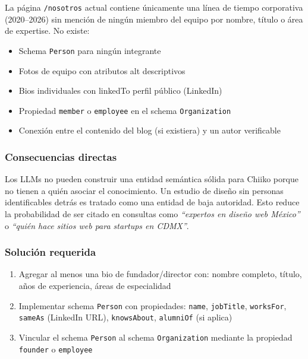 \documentclass[12pt, a4paper]{article}
\begin{document}
La página \texttt{/nosotros} actual contiene únicamente una línea de tiempo corporativa (2020–2026) sin mención de ningún miembro del equipo por nombre, título o área de expertise. No existe:
\begin{itemize}[itemsep=3pt]
  \item Schema \texttt{Person} para ningún integrante
  \item Fotos de equipo con atributos alt descriptivos
  \item Bios individuales con linkedTo perfil público (LinkedIn)
  \item Propiedad \texttt{member} o \texttt{employee} en el schema \texttt{Organization}
  \item Conexión entre el contenido del blog (si existiera) y un autor verificable
\end{itemize}

\subsubsection{Consecuencias directas}

Los LLMs no pueden construir una entidad semántica sólida para Chiiko porque no tienen a quién asociar el conocimiento. Un estudio de diseño sin personas identificables detrás es tratado como una entidad de baja autoridad. Esto reduce la probabilidad de ser citado en consultas como \textit{``expertos en diseño web México''} o \textit{``quién hace sitios web para startups en CDMX''}.

\subsubsection{Solución requerida}

\begin{enumerate}[itemsep=4pt]
  \item Agregar al menos una bio de fundador/director con: nombre completo, título, años de experiencia, áreas de especialidad
  \item Implementar schema \texttt{Person} con propiedades: \texttt{name}, \texttt{jobTitle}, \texttt{worksFor}, \texttt{sameAs} (LinkedIn URL), \texttt{knowsAbout}, \texttt{alumniOf} (si aplica)
  \item Vincular el schema \texttt{Person} al schema \texttt{Organization} mediante la propiedad \texttt{founder} o \texttt{employee}
\end{enumerate}

\end{document}
